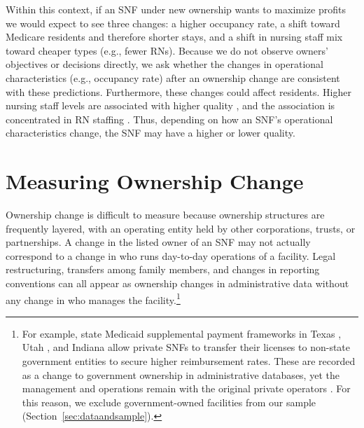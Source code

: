 \documentclass[12pt]{article}
\begin{document}
Within this context, if an SNF under new ownership wants to maximize profits we would expect to see three changes: a higher occupancy rate, a shift toward Medicare residents and therefore shorter stays, and a shift in nursing staff mix toward cheaper types (e.g., fewer RNs). Because we do not observe owners' objectives or decisions directly, we ask whether the changes in operational characteristics (e.g., occupancy rate) after an ownership change are consistent with these predictions. Furthermore, these changes could affect residents. Higher nursing staff levels are associated with higher quality \citep{harrington_et_al_2000, zhang_grabowski_2004}, and the association is concentrated in RN staffing \citep{lin_2014}. Thus, depending on how an SNF’s operational characteristics change, the SNF may have a higher or lower quality.

\section{Measuring Ownership Change} \label{sec:measuring-ownership}

Ownership change is difficult to measure because ownership structures are frequently layered, with an operating entity held by other corporations, trusts, or partnerships. A change in the listed owner of an SNF may not actually correspond to a change in who runs day-to-day operations of a facility. Legal restructuring, transfers among family members, and changes in reporting conventions can all appear as ownership changes in administrative data without any change in who manages the facility.\footnote{For example, state Medicaid supplemental payment frameworks in Texas \citep{tex_admin_code_353_1302}, Utah \citep{utah_admin_code_r414_505_5}, and Indiana \citep{ind_code_12_15_14} allow private SNFs to transfer their licenses to non-state government entities to secure higher reimbursement rates. These are recorded as a change to government ownership in administrative databases, yet the management and operations remain with the original private operators \citep{utah_auditor_2026_snf_upl, kffhn_2017_indiana_nh, kxan_2021_qipp}. For this reason, we exclude government-owned facilities from our sample (Section~\ref{sec:dataandsample}).}
\end{document}
